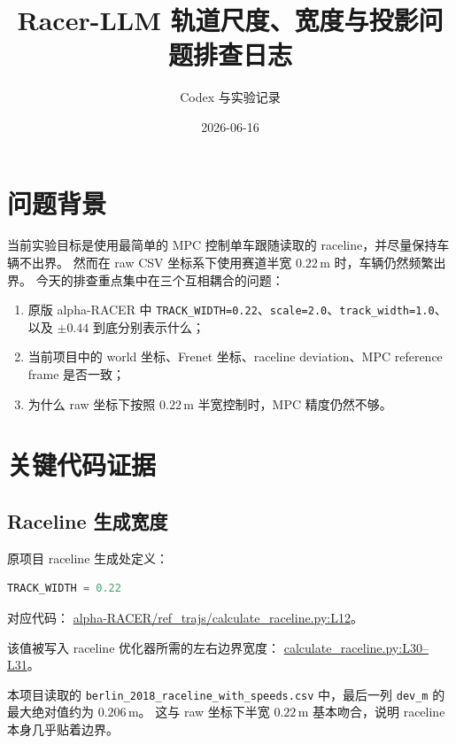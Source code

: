 \documentclass[UTF8]{ctexart}
\title{Racer-LLM 轨道尺度、宽度与投影问题排查日志}
\author{Codex 与实验记录}
\date{2026-06-16}
\begin{document}
\maketitle

\section{问题背景}

当前实验目标是使用最简单的 MPC 控制单车跟随读取的 raceline，并尽量保持车辆不出界。
然而在 raw CSV 坐标系下使用赛道半宽 $0.22\,\mathrm{m}$ 时，车辆仍然频繁出界。
今天的排查重点集中在三个互相耦合的问题：

\begin{enumerate}[label=(\arabic*)]
  \item 原版 alpha-RACER 中 \texttt{TRACK\_WIDTH=0.22}、\texttt{scale=2.0}、\texttt{track\_width=1.0}、以及 \texttt{\(\pm 0.44\)} 到底分别表示什么；
  \item 当前项目中的 world 坐标、Frenet 坐标、raceline deviation、MPC reference frame 是否一致；
  \item 为什么 raw 坐标下按照 $0.22\,\mathrm{m}$ 半宽控制时，MPC 精度仍然不够。
\end{enumerate}

\section{关键代码证据}

\subsection{Raceline 生成宽度}

原项目 raceline 生成处定义：

\begin{lstlisting}[language=Python]
TRACK_WIDTH = 0.22
\end{lstlisting}

对应代码：
\href{https://github.com/sastry-group/alpha-RACER/blob/main/ref_trajs/calculate_raceline.py#L12}{alpha-RACER/ref\_trajs/calculate\_raceline.py:L12}。

该值被写入 raceline 优化器所需的左右边界宽度：
\href{https://github.com/sastry-group/alpha-RACER/blob/main/ref_trajs/calculate_raceline.py#L30-L31}{calculate\_raceline.py:L30--L31}。

本项目读取的 \texttt{berlin\_2018\_raceline\_with\_speeds.csv} 中，最后一列 \texttt{dev\_m} 的最大绝对值约为 $0.206\,\mathrm{m}$。
这与 raw 坐标下半宽 $0.22\,\mathrm{m}$ 基本吻合，说明 raceline 本身几乎贴着边界。
\end{document}
